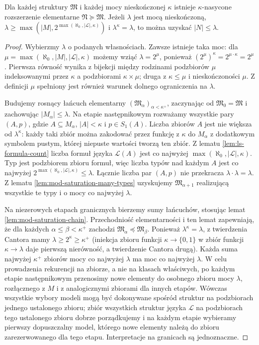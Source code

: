 \begin{twierdzenie}
\label{thm:mod-saturation-extension}
Dla każdej struktury $\mathfrak M$ i każdej mocy
nieskończonej $\kappa$ istnieje $\kappa$-nasycone
rozszerzenie elementarne $\mathfrak N\succeq\mathfrak M$.
Jeżeli $\lambda$ jest mocą nieskończoną,
$\lambda\geq\max(|M|,2^{\max(\aleph_0,|\mathcal L|,\kappa)})$ i
$\lambda^\kappa=\lambda$, to można uzyskać
$|N|\leq\lambda$.
\end{twierdzenie}
\begin{proof}
Wybierzmy $\lambda$ o podanych własnościach. Zawsze istnieje
taka moc: dla $\mu=\max(\aleph_0,|M|,|\mathcal L|,\kappa)$
możemy wziąć $\lambda=2^\mu$, ponieważ
$(2^\mu)^\kappa=2^{\mu\cdot\kappa}=2^\mu$.
Pierwsza równość wynika z bijekcji między rodzinami
podzbiorów $\mu$ indeksowanymi przez $\kappa$ a podzbiorami
$\kappa\times\mu$; druga z $\kappa\leq\mu$ i nieskończoności
$\mu$. Z definicji $\mu$ spełniony jest również warunek
dolnego ograniczenia na $\lambda$.

Budujemy rosnący łańcuch elementarny
$(\mathfrak M_\alpha)_{\alpha<\kappa^+}$,
zaczynając od $\mathfrak M_0=\mathfrak M$ i zachowując
$|M_\alpha|\leq\lambda$. Na etapie następnikowym
rozważamy wszystkie pary $(A,p)$, gdzie
$A\subseteq M_\alpha$, $|A|<\kappa$ i $p\in S_1(A)$.
Liczba zbiorów $A$ jest nie większa od $\lambda^\kappa$:
każdy taki zbiór można zakodować przez funkcję z $\kappa$
do $M_\alpha$ z dodatkowym symbolem pustym, której
niepuste wartości tworzą ten zbiór.
Z lematu \ref{lem:ls-formula-count} liczba formuł języka
$\mathcal L(A)$ jest co najwyżej
$\max(\aleph_0,|\mathcal L|,\kappa)$.
Typ jest podzbiorem zbioru formuł, więc liczba typów
nad każdym $A$ jest co najwyżej
$2^{\max(\aleph_0,|\mathcal L|,\kappa)}\leq\lambda$.
Łącznie liczba par $(A,p)$ nie przekracza
$\lambda\cdot\lambda=\lambda$.
Z lematu \ref{lem:mod-saturation-many-types} uzyskujemy
$\mathfrak M_{\alpha+1}$ realizującą wszystkie te typy
i o mocy co najwyżej $\lambda$.

Na niezerowych etapach granicznych bierzemy sumy łańcuchów,
stosując lemat \ref{lem:mod-saturation-chain}. Przechodniość
elementarności i ten lemat zapewniają, że dla każdych
$\alpha\leq\beta<\kappa^+$ zachodzi
$\mathfrak M_\alpha\preccurlyeq\mathfrak M_\beta$. Ponieważ
$\lambda^\kappa=\lambda$, z twierdzenia Cantora mamy
$\lambda\geq 2^\kappa\geq\kappa^+$ (iniekcja zbioru
funkcji $\kappa\to\{0,1\}$ w zbiór funkcji $\kappa\to\lambda$
daje pierwszą nierówność, a twierdzenie Cantora drugą).
Każda suma najwyżej
$\kappa^+$ zbiorów mocy co najwyżej $\lambda$ ma moc
co najwyżej $\lambda$.
W celu prowadzenia rekurencji na zbiorze, a nie na
klasach właściwych, po każdym etapie następnikowym
przenosimy nowe elementy do osobnego zbioru mocy
$\lambda$, rozłącznego z $M$ i z analogicznymi zbiorami
dla innych etapów. Wówczas wszystkie wybory modeli
mogą być dokonywane spośród struktur na podzbiorach
jednego ustalonego zbioru; zbiór wszystkich struktur języka $\mathcal L$ na podzbiorach
tego ustalonego zbioru dobrze porządkujemy i na każdym
etapie wybieramy pierwszy dopuszczalny model, którego
nowe elementy należą do zbioru zarezerwowanego dla
tego etapu. Interpretacje na granicach są jednoznaczne.


\end{proof}

